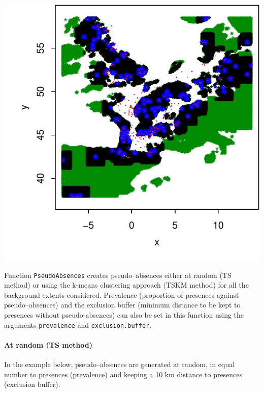\documentclass[10pt,a4paper]{article}\usepackage[]{graphicx}\usepackage[]{color}
\makeatletter
\def\maxwidth{ %
  \ifdim\Gin@nat@width>\linewidth
    \linewidth
  \else
    \Gin@nat@width
  \fi
}
\newenvironment{knitrout}{}{} %
\makeatother
\begin{document}
\begin{knitrout}
{\centering \includegraphics[width=\maxwidth]{figure/graphics-mopa8-1} 

}



\end{knitrout}

Function \texttt{PseudoAbsences} creates pseudo--absences either at random (TS method) or using the k-means clustering approach (TSKM method) for all the background extents considered. Prevalence (proportion of presences against pseudo--absences) and the exclusion buffer (minimum distance to be kept to presences without pseudo-absences) can also be set in this function using the arguments \texttt{prevalence} and \texttt{exclusion.buffer}.

\paragraph{At random (TS method)}

In the example below, pseudo--absences are generated at random, in equal number to presences (prevalence) and keeping a 10 km distance to presences (exclusion buffer).
\end{document}
